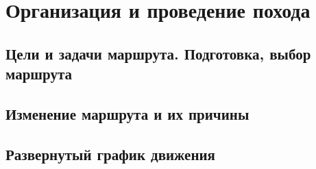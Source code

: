\section{Организация и проведение похода}
\subsection{Цели и задачи маршрута. Подготовка, выбор маршрута}
\subsection{Изменение маршрута и их причины}
\subsection{Развернутый график движения}